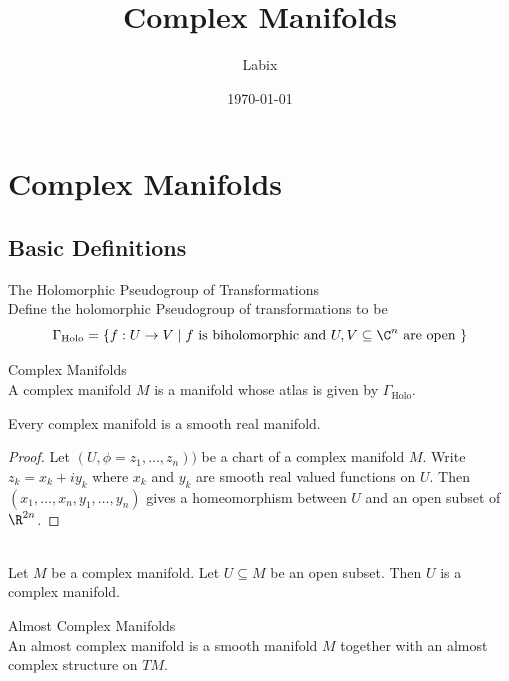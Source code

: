 \documentclass[a4paper]{article}
\title{Complex Manifolds}
\author{Labix}
\date{\today}
\begin{document}
\maketitle
\begin{abstract}
\end{abstract}
\pagebreak
\tableofcontents

\pagebreak
\section{Complex Manifolds}
\subsection{Basic Definitions}
\begin{defn}{The Holomorphic Pseudogroup of Transformations}{}\\
Define the holomorphic Pseudogroup of transformations to be $$\Gamma_\text{Holo}=\{f:U\to V\;|\;f\text{ is biholomorphic and }U,V\subseteq\C^n\text{ are open }\}$$
\end{defn}

\begin{defn}{Complex Manifolds}{}\\
A complex manifold $M$ is a manifold whose atlas is given by $\Gamma_\text{Holo}$. 
\end{defn}

\begin{prp}{}{} Every complex manifold is a smooth real manifold. 
\begin{proof}
Let $(U,\phi=z_1,\dots,z_n))$ be a chart of a complex manifold $M$. Write $z_k=x_k+iy_k$ where $x_k$ and $y_k$ are smooth real valued functions on $U$. Then $(x_1,\dots,x_n,y_1,\dots,y_n)$ gives a homeomorphism between $U$ and an open subset of $\R^{2n}$. 
\end{proof}
\end{prp}

\begin{lmm}{}{}\\
Let $M$ be a complex manifold. Let $U\subseteq M$ be an open subset. Then $U$ is a complex manifold. 
\end{lmm}

\begin{defn}{Almost Complex Manifolds}{}\\
An almost complex manifold is a smooth manifold $M$ together with an almost complex structure on $TM$. 
\end{defn}
\end{document}
